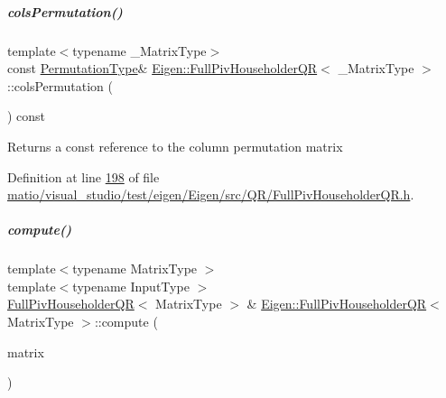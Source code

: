 \mbox{\label{group___q_r___module_abeda6d91e196c13d4dd8b7542fef3e17}} 
\subparagraph{\texorpdfstring{cols\+Permutation()}{colsPermutation()}\hspace{0.1cm}{\footnotesize\ttfamily [2/2]}}
{\footnotesize\ttfamily template$<$typename \+\_\+\+Matrix\+Type$>$ \\
const \hyperlink{group___core___module}{Permutation\+Type}\& \hyperlink{group___q_r___module_class_eigen_1_1_full_piv_householder_q_r}{Eigen\+::\+Full\+Piv\+Householder\+QR}$<$ \+\_\+\+Matrix\+Type $>$\+::cols\+Permutation (\begin{DoxyParamCaption}{ }\end{DoxyParamCaption}) const\hspace{0.3cm}{\ttfamily [inline]}}

\begin{DoxyReturn}{Returns}
a const reference to the column permutation matrix 
\end{DoxyReturn}


Definition at line \hyperlink{matio_2visual__studio_2test_2eigen_2_eigen_2src_2_q_r_2_full_piv_householder_q_r_8h_source_l00198}{198} of file \hyperlink{matio_2visual__studio_2test_2eigen_2_eigen_2src_2_q_r_2_full_piv_householder_q_r_8h_source}{matio/visual\+\_\+studio/test/eigen/\+Eigen/src/\+Q\+R/\+Full\+Piv\+Householder\+Q\+R.\+h}.

\mbox{\label{group___q_r___module_a41ac74d6615e52e0fd7c0aaa8d3106b4}} 
\subparagraph{\texorpdfstring{compute()}{compute()}}
{\footnotesize\ttfamily template$<$typename Matrix\+Type $>$ \\
template$<$typename Input\+Type $>$ \\
\hyperlink{group___q_r___module_class_eigen_1_1_full_piv_householder_q_r}{Full\+Piv\+Householder\+QR}$<$ Matrix\+Type $>$ \& \hyperlink{group___q_r___module_class_eigen_1_1_full_piv_householder_q_r}{Eigen\+::\+Full\+Piv\+Householder\+QR}$<$ Matrix\+Type $>$\+::compute (\begin{DoxyParamCaption}\item[{const \hyperlink{group___core___module_struct_eigen_1_1_eigen_base}{Eigen\+Base}$<$ Input\+Type $>$ \&}]{matrix }\end{DoxyParamCaption})}


